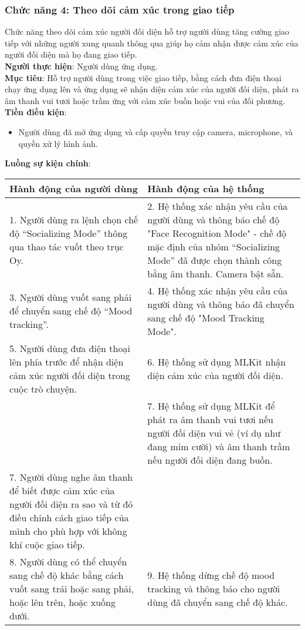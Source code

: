 \documentclass[a4paper,12pt]{article}
\begin{document}
\subsubsection{Chức năng 4: Theo dõi cảm xúc trong giao tiếp}
Chức năng theo dõi cảm xúc người đối diện hỗ trợ người dùng tăng cường giao tiếp với những người xung quanh thông qua giúp họ cảm nhận được cảm xúc của người đối diện mà họ đang giao tiếp.
\\
\textbf{Người thực hiện}: Người dùng ứng dụng.
\\
\textbf{Mục tiêu}: Hỗ trợ người dùng trong việc giao tiếp, bằng cách đưa điện thoại chạy ứng dụng lên và ứng dụng sẽ nhận diện cảm xúc của người đối diện, phát ra âm thanh vui tươi hoặc trầm ứng với cảm xúc buồn hoặc vui của đối phương.
\\
\textbf{Tiền điều kiện}:
\begin{itemize}
    \item Người dùng đã mở ứng dụng và cấp quyền truy cập camera, microphone, và quyền xử lý hình ảnh.
\end{itemize}

\textbf{Luồng sự kiện chính}:
\\
\begin{longtable}{|p{6cm}|p{8cm}|}
\hline
\textbf{Hành động của người dùng} & \textbf{Hành động của hệ thống} \\
\hline
1. Người dùng ra lệnh chọn chế độ “Socializing Mode” thông qua thao tác vuốt theo trục Oy. & 
2. Hệ thống xác nhận yêu cầu của người dùng và thông báo chế độ "Face Recognition Mode" - chế độ mặc định của nhóm “Socializing Mode” đã được chọn thành công bằng âm thanh. Camera bật sẵn. \\
\hline
3. Người dùng vuốt sang phải để chuyển sang chế độ “Mood tracking”. & 
4. Hệ thống xác nhận yêu cầu của người dùng và thông báo đã chuyển sang chế độ "Mood Tracking Mode". \\
\hline
5. Người dùng đưa điện thoại lên phía trước để nhận diện cảm xúc người đối diện trong cuộc trò chuyện. & 
6. Hệ thống sử dụng MLKit nhận diện cảm xúc của người đối diện. \\
\hline
& 7. Hệ thống sử dụng MLKit để phát ra âm thanh vui tươi nếu người đối diện vui vẻ (ví dụ như đang mỉm cười) và âm thanh trầm nếu người đối diện đang buồn. \\
\hline
7. Người dùng nghe âm thanh để biết được cảm xúc của người đối diện ra sao và từ đó điều chỉnh cách giao tiếp của mình cho phù hợp với không khí cuộc giao tiếp. &\\
\hline
8. Người dùng có thể chuyển sang chế độ khác bằng cách vuốt sang trái hoặc sang phải, hoặc lên trên, hoặc xuống dưới. & 
9. Hệ thống dừng chế độ mood tracking và thông báo cho người dùng đã chuyển sang chế độ khác. \\
\hline
\end{longtable}
\end{document}
